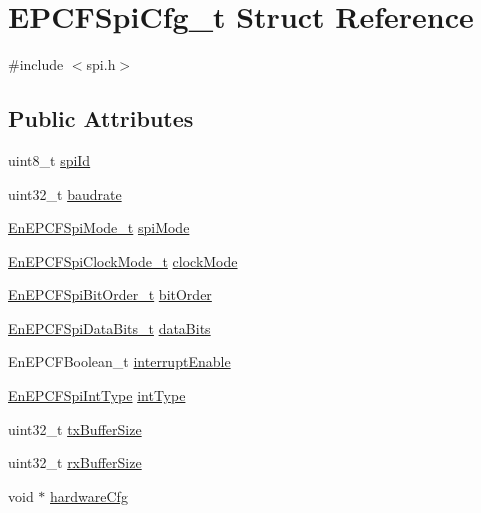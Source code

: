 \hypertarget{structEPCFSpiCfg__t}{}\section{E\+P\+C\+F\+Spi\+Cfg\+\_\+t Struct Reference}
\label{structEPCFSpiCfg__t}


{\ttfamily \#include $<$spi.\+h$>$}

\subsection*{Public Attributes}
\begin{DoxyCompactItemize}
\item 
uint8\+\_\+t \mbox{\hyperlink{structEPCFSpiCfg__t_a5314eb81f6875767caab126fedae9f15}{spi\+Id}}
\item 
uint32\+\_\+t \mbox{\hyperlink{structEPCFSpiCfg__t_a365a79989b5dbf272f6ead275f3eacc8}{baudrate}}
\item 
\mbox{\hyperlink{spi_8h_a236709e1f18b5113eef01990887fe91b}{En\+E\+P\+C\+F\+Spi\+Mode\+\_\+t}} \mbox{\hyperlink{structEPCFSpiCfg__t_a3e83f10555a722009e6699fb889a001a}{spi\+Mode}}
\item 
\mbox{\hyperlink{spi_8h_ab09c9cb12602a4eaf6e6814aecb7f69d}{En\+E\+P\+C\+F\+Spi\+Clock\+Mode\+\_\+t}} \mbox{\hyperlink{structEPCFSpiCfg__t_a3cdc8c111b764560873fd65da25a234e}{clock\+Mode}}
\item 
\mbox{\hyperlink{spi_8h_a5669bc3ec8d7e355a15f0b6e37a0ff7b}{En\+E\+P\+C\+F\+Spi\+Bit\+Order\+\_\+t}} \mbox{\hyperlink{structEPCFSpiCfg__t_ab112623bd3baa256760859df415fb028}{bit\+Order}}
\item 
\mbox{\hyperlink{spi_8h_a10cc73e5172b31534f1e7adfc0da0a74}{En\+E\+P\+C\+F\+Spi\+Data\+Bits\+\_\+t}} \mbox{\hyperlink{structEPCFSpiCfg__t_a3468918ae35e8c3d2848aa263a12a80b}{data\+Bits}}
\item 
En\+E\+P\+C\+F\+Boolean\+\_\+t \mbox{\hyperlink{structEPCFSpiCfg__t_a2cd0f114ed22c3bd36412e0d1431053b}{interrupt\+Enable}}
\item 
\mbox{\hyperlink{spi_8h_a270c561e7d4dc10fee5b99a87b3d4e5d}{En\+E\+P\+C\+F\+Spi\+Int\+Type}} \mbox{\hyperlink{structEPCFSpiCfg__t_a9406d27500657f8a86b26c0e1e34df28}{int\+Type}}
\item 
uint32\+\_\+t \mbox{\hyperlink{structEPCFSpiCfg__t_aecb6de093296bddc9816d78f6b0e1e43}{tx\+Buffer\+Size}}
\item 
uint32\+\_\+t \mbox{\hyperlink{structEPCFSpiCfg__t_a118e00c9e4a72a38df503e0231a512be}{rx\+Buffer\+Size}}
\item 
void $\ast$ \mbox{\hyperlink{structEPCFSpiCfg__t_aa62d289f92ac272e68466286b03f76db}{hardware\+Cfg}}
\end{DoxyCompactItemize}


